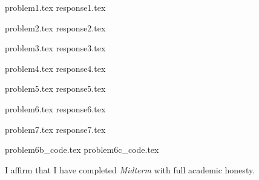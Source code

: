 \documentclass[letterpaper, 12pt]{article}
\begin{document}

{problem1.tex}
{response1.tex}

{problem2.tex}
{response2.tex}

{problem3.tex}
{response3.tex}

{problem4.tex}
{response4.tex}

{problem5.tex}
{response5.tex}

{problem6.tex}
{response6.tex}

{problem7.tex}
{response7.tex}

\appendix

{problem6b_code.tex}
{problem6c_code.tex}

\par

I affirm that I have completed \textit{Midterm} with full academic honesty.
\end{document}
